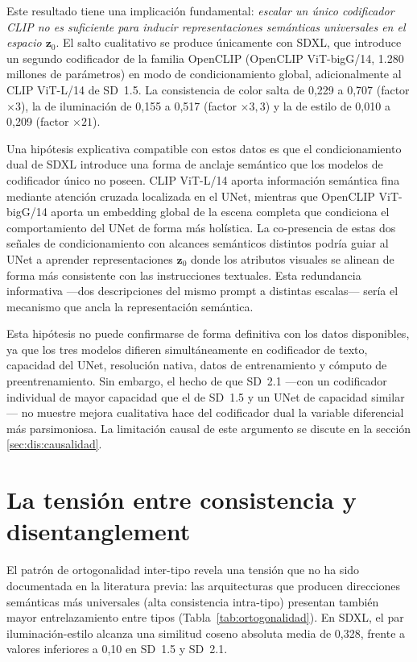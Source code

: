 \documentclass[12pt, a4paper, twoside]{book}
\newcommand{\z}{\mathbf{z}}
\begin{document}
Este resultado tiene una implicación fundamental: \textit{escalar un único codificador CLIP no es suficiente para inducir representaciones semánticas universales en el espacio $\z_0$}. El salto cualitativo se produce únicamente con SDXL, que introduce un segundo codificador de la familia OpenCLIP (OpenCLIP ViT-bigG/14, 1.280 millones de parámetros) en modo de condicionamiento global, adicionalmente al CLIP ViT-L/14 de SD~1.5. La consistencia de color salta de 0,229 a 0,707 (factor $\times 3$), la de iluminación de 0,155 a 0,517 (factor $\times 3{,}3$) y la de estilo de 0,010 a 0,209 (factor $\times 21$).

Una hipótesis explicativa compatible con estos datos es que el condicionamiento dual de SDXL introduce una forma de anclaje semántico que los modelos de codificador único no poseen. CLIP ViT-L/14 aporta información semántica fina mediante atención cruzada localizada en el UNet, mientras que OpenCLIP ViT-bigG/14 aporta un embedding global de la escena completa que condiciona el comportamiento del UNet de forma más holística. La co-presencia de estas dos señales de condicionamiento con alcances semánticos distintos podría guiar al UNet a aprender representaciones $\z_0$ donde los atributos visuales se alinean de forma más consistente con las instrucciones textuales. Esta redundancia informativa ---dos descripciones del mismo prompt a distintas escalas--- sería el mecanismo que ancla la representación semántica.

Esta hipótesis no puede confirmarse de forma definitiva con los datos disponibles, ya que los tres modelos difieren simultáneamente en codificador de texto, capacidad del UNet, resolución nativa, datos de entrenamiento y cómputo de preentrenamiento. Sin embargo, el hecho de que SD~2.1 ---con un codificador individual de mayor capacidad que el de SD~1.5 y un UNet de capacidad similar--- no muestre mejora cualitativa hace del codificador dual la variable diferencial más parsimoniosa. La limitación causal de este argumento se discute en la sección \ref{sec:dis:causalidad}.

\section{La tensión entre consistencia y disentanglement}
\label{sec:dis:tension}

El patrón de ortogonalidad inter-tipo revela una tensión que no ha sido documentada en la literatura previa: las arquitecturas que producen direcciones semánticas más universales (alta consistencia intra-tipo) presentan también mayor entrelazamiento entre tipos (Tabla~\ref{tab:ortogonalidad}). En SDXL, el par iluminación-estilo alcanza una similitud coseno absoluta media de 0,328, frente a valores inferiores a 0,10 en SD~1.5 y SD~2.1.
\end{document}
